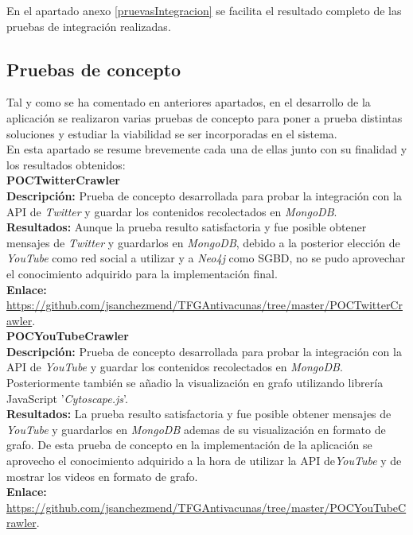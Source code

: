 \documentclass[11pt,a4paper]{article}
\begin{document}
En el apartado anexo \ref{pruevasIntegracion} se facilita el resultado completo de las pruebas de integración realizadas.
\medskip 

\subsection{Pruebas de concepto}\label{pocs}
Tal y como se ha comentado en anteriores apartados, en el desarrollo de la aplicación se realizaron varias pruebas de concepto para poner a prueba distintas soluciones y estudiar la viabilidad se ser incorporadas en el sistema.
\\

En esta apartado se resume brevemente cada una de ellas junto con su finalidad y los resultados obtenidos:
\\

\noindent\textbf{POCTwitterCrawler}\\
\textbf{Descripción:} Prueba de concepto desarrollada para probar la integración con la API de \textit{Twitter} y guardar los contenidos recolectados en \textit{MongoDB}.\\
\textbf{Resultados:} Aunque la prueba resulto satisfactoria y fue posible obtener mensajes de \textit{Twitter} y guardarlos en \textit{MongoDB}, debido a la posterior elección de \textit{YouTube} como red social a utilizar y a \textit{Neo4j} como SGBD, no se pudo aprovechar el conocimiento adquirido para la implementación final.\\
\textbf{Enlace:} \url{https://github.com/jsanchezmend/TFGAntivacunas/tree/master/POCTwitterCrawler}.
\\

\noindent\textbf{POCYouTubeCrawler}\\
\textbf{Descripción:} Prueba de concepto desarrollada para probar la integración con la API de \textit{YouTube} y guardar los contenidos recolectados en \textit{MongoDB}. Posteriormente también se añadio la visualización en grafo utilizando librería JavaScript '\textit{Cytoscape.js}'.\\
\textbf{Resultados:} La prueba resulto satisfactoria y fue posible obtener mensajes de \textit{YouTube} y guardarlos en \textit{MongoDB} ademas de su visualización en formato de grafo. De esta prueba de concepto en la implementación de la aplicación se aprovecho el conocimiento adquirido a la hora de utilizar la API de\textit{YouTube} y de mostrar los videos en formato de grafo.\\
\textbf{Enlace:} \url{https://github.com/jsanchezmend/TFGAntivacunas/tree/master/POCYouTubeCrawler}.
\\
\end{document}
